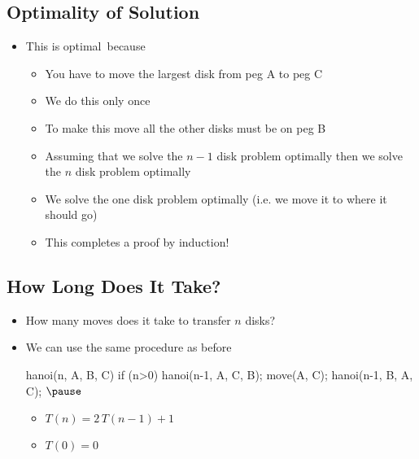 \begin{slide}
\section{Optimality of Solution}

\begin{PauseHighLight}
  \begin{itemize}
  \item This is optimal\pause\ because
    \begin{itemize}
    \item You have to move the largest disk from peg A to peg C\pause
    \item We do this only once\pause
    \item To make this move all the other disks must be on peg B\pause
    \item Assuming that we solve the $n-1$ disk problem optimally then we
      solve the $n$ disk problem optimally\pause
    \item We solve the one disk problem optimally (i.e. we move it to
      where it should go)\pause
    \item This completes a proof by induction!\pause 
    \end{itemize}
  \end{itemize}
\end{PauseHighLight}
\end{slide}



\begin{slide}
\section{How Long Does It Take?}
\pausebuild
\begin{itemize}
\item How many moves does it take to transfer $n$ disks?\pause
\item We can use the same procedure as before
\begin{java}
  hanoi(n, A, B, C)
  {
    if (n>0) {
       hanoi(n-1, A, C, B);
       move(A, C);
       hanoi(n-1, B, A, C);
    }
  }$\pause$
\end{java}
\begin{itemize}
\item $T(n) = 2\,T(n-1) + 1$
\item $T(0) = 0$\pause
\end{itemize}
\end{itemize}
\end{slide}

